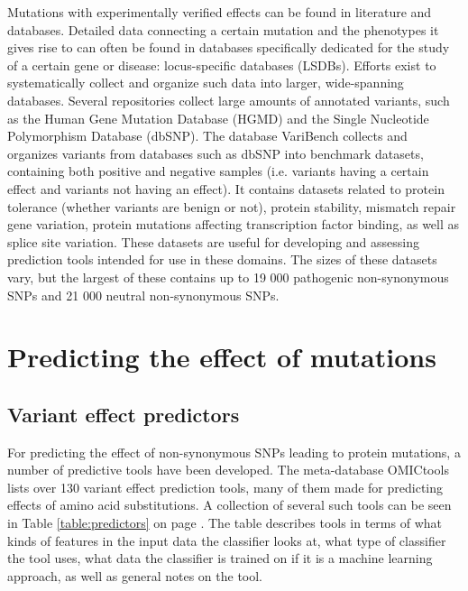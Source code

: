 Mutations with experimentally verified effects can be found in literature and databases. Detailed data connecting a certain mutation and the phenotypes it gives rise to can often be found in databases specifically dedicated for the study of a certain gene or disease: locus-specific databases (LSDBs).\cite{giardine2007phencode} Efforts exist to systematically collect and organize such data into larger, wide-spanning databases. Several repositories collect large amounts of annotated variants, such as the Human Gene Mutation Database (HGMD)\cite{stenson2009human} and the Single Nucleotide Polymorphism Database (dbSNP)\cite{sherry2001dbsnp}. The database VariBench\cite{nair2013varibench} collects and organizes variants from databases such as dbSNP into benchmark datasets, containing both positive and negative samples (i.e. variants having a certain effect and variants not having an effect). It contains datasets related to protein tolerance (whether variants are benign or not), protein stability, mismatch repair gene variation, protein mutations affecting transcription factor binding, as well as splice site variation.\cite{nair2013varibench} These datasets are useful for developing and assessing prediction tools intended for use in these domains. The sizes of these datasets vary, but the largest of these contains up to 19 000 pathogenic non-synonymous SNPs and 21 000 neutral non-synonymous SNPs.

\section{Predicting the effect of mutations}

\subsection{Variant effect predictors}

For predicting the effect of non-synonymous SNPs leading to protein mutations, a number of predictive tools have been developed. The meta-database OMICtools\cite{henry2014omictools} lists over 130 variant effect prediction tools, many of them made for predicting effects of amino acid substitutions. A collection of several such tools can be seen in Table \ref{table:predictors} on page \pageref{table:predictors}. The table describes tools in terms of what kinds of features in the input data the classifier looks at, what type of classifier the tool uses, what data the classifier is trained on if it is a machine learning approach, as well as general notes on the tool.

